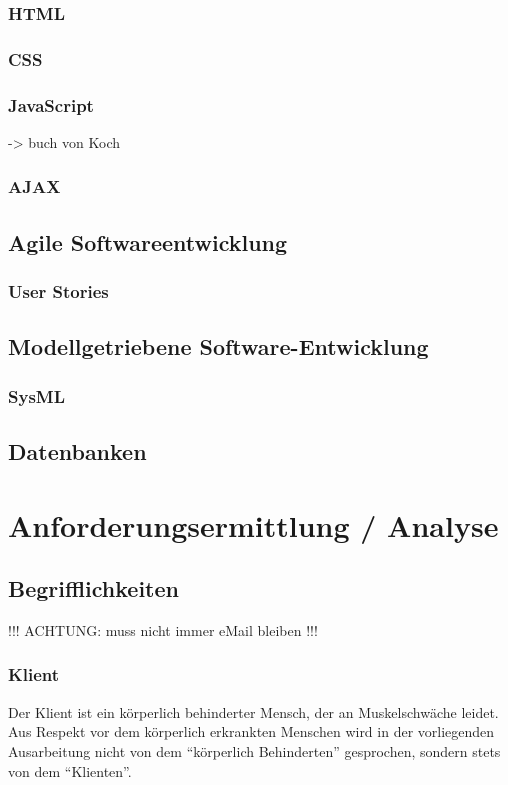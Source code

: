 \documentclass[12pt,a4paper,titlepage]{article} %
\begin{document}
\subsubsection{HTML}
\subsubsection{CSS}
\subsubsection{JavaScript}
-> buch von Koch
\subsubsection{AJAX}
\subsection{Agile Softwareentwicklung}
\subsubsection{User Stories}
\subsection{Modellgetriebene Software-Entwicklung}
\subsubsection{SysML}
\subsection{Datenbanken} %

\section{Anforderungsermittlung / Analyse} %
\subsection{Begrifflichkeiten}

!!! ACHTUNG: muss nicht immer eMail bleiben !!!

\subsubsection{Klient}
Der Klient ist ein körperlich behinderter Mensch, der an Muskelschwäche leidet. %
Aus Respekt vor dem körperlich erkrankten Menschen wird in der vorliegenden Ausarbeitung nicht von dem \enquote{körperlich Behinderten} gesprochen, sondern stets von dem \enquote{Klienten}.
\end{document}
